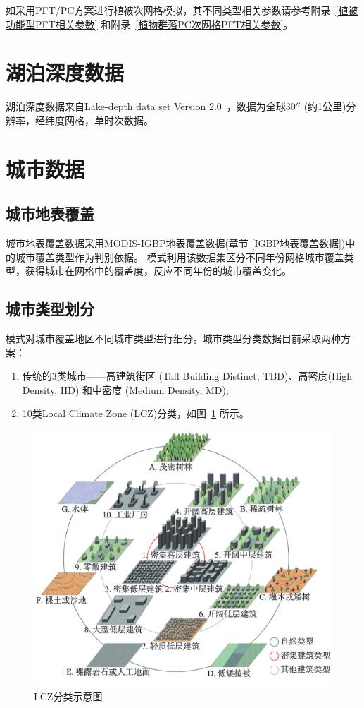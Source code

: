 如采用PFT/PC方案进行植被次网格模拟，其不同类型相关参数请参考附录~\ref{植被功能型PFT相关参数} 和附录~\ref{植物群落PC次网格PFT相关参数}。


\section{湖泊深度数据}\label{湖泊深度数据}
湖泊深度数据来自Lake-depth data set Version 2.0~\citep{kourzeneva2012global}，数据为全球$30''$ (约1公里)分辨率，经纬度网格，单时次数据。


\section{城市数据}\label{城市数据}

\subsection{城市地表覆盖}\label{城市地表覆盖}
城市地表覆盖数据采用MODIS-IGBP地表覆盖数据(章节 \ref{IGBP地表覆盖数据})中的城市覆盖类型作为判别依据。
模式利用该数据集区分不同年份网格城市覆盖类型，获得城市在网格中的覆盖度，反应不同年份的城市覆盖变化。

\subsection{城市类型划分}\label{城市类型划分}
模式对城市覆盖地区不同城市类型进行细分。城市类型分类数据目前采取两种方案：
\begin{enumerate}
    \item 传统的3类城市——高建筑街区 (Tall Building Distinct, TBD)、高密度(High Density, HD) 和中密度 (Medium Density, MD);
    \item 10类Local Climate Zone (LCZ)分类，如图~\ref{fig:LCZ分类图示}  所示。
\end{enumerate}
{
\begin{figure}[]
\centering
\includegraphics{Figures/地表输入数据/LCZ分类图示.png}
\caption{LCZ分类示意图}
\label{fig:LCZ分类图示}
\end{figure}
}


